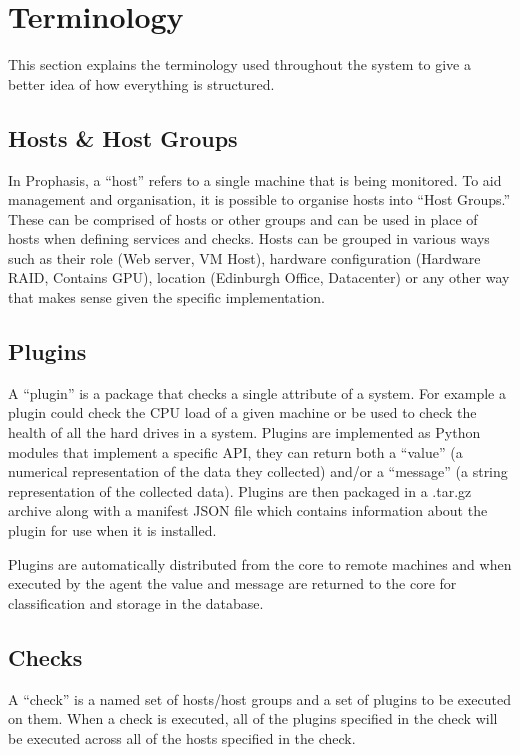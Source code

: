 \documentclass[bsc,deptreport,twoside,parskip,singlespacing,notimes]{infthesis}
\begin{document}
\section{Terminology}

	This section explains the terminology used throughout the system to give a
	better idea of how everything is structured.

\subsection{Hosts \& Host Groups}

	In Prophasis, a ``host'' refers to a single machine that is being monitored. To
	aid management and organisation, it is possible to organise hosts into ``Host
	Groups.''  These can be comprised of hosts or other groups and can be used in
	place of hosts when defining services and checks.  Hosts can be grouped in
	various ways such as their role (Web server, VM Host), hardware configuration
	(Hardware RAID, Contains GPU), location (Edinburgh Office, Datacenter) or any
	other way that makes sense given the specific implementation.

\subsection{Plugins}

	A ``plugin'' is a package that checks a single attribute of a system.  For
	example a plugin could check the CPU load of a given machine or be used to
	check the health of all the hard drives in a system.  Plugins are implemented
	as Python modules that implement a specific API, they can return both a ``value''
	(a numerical representation of the data they collected) and/or a ``message'' (a
	string representation of the collected data).  Plugins are then packaged in a
	.tar.gz archive along with a manifest JSON file which contains information
	about the plugin for use when it is installed.


	Plugins are automatically distributed from the core to remote machines and when
	executed by the agent the value and message are returned to the core for
	classification and storage in the database.

\subsection{Checks}

	A ``check'' is a named set of hosts/host groups and a set of plugins to be
	executed on them.  When a check is executed, all of the plugins specified in
	the check will be executed across all of the hosts specified in the check.
\end{document}
